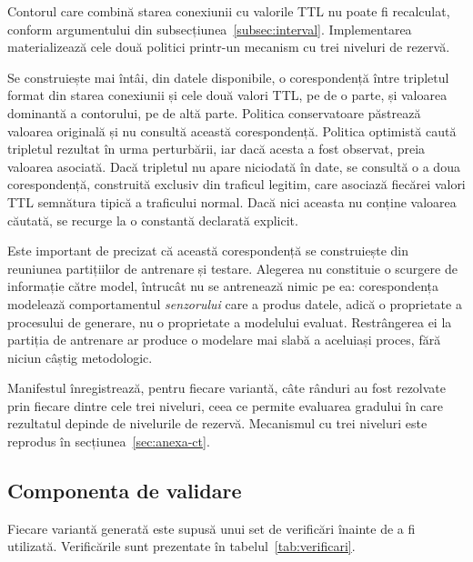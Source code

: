 Contorul care combină starea conexiunii cu valorile TTL nu poate fi recalculat, conform argumentului din subsecțiunea~\ref{subsec:interval}. Implementarea materializează cele două politici printr-un mecanism cu trei niveluri de rezervă.

Se construiește mai întâi, din datele disponibile, o corespondență între tripletul format din starea conexiunii și cele două valori TTL, pe de o parte, și valoarea dominantă a contorului, pe de altă parte. Politica conservatoare păstrează valoarea originală și nu consultă această corespondență. Politica optimistă caută tripletul rezultat în urma perturbării, iar dacă acesta a fost observat, preia valoarea asociată. Dacă tripletul nu apare niciodată în date, se consultă o a doua corespondență, construită exclusiv din traficul legitim, care asociază fiecărei valori TTL semnătura tipică a traficului normal. Dacă nici aceasta nu conține valoarea căutată, se recurge la o constantă declarată explicit.

Este important de precizat că această corespondență se construiește din reuniunea partițiilor de antrenare și testare. Alegerea nu constituie o scurgere de informație către model, întrucât nu se antrenează nimic pe ea: corespondența modelează comportamentul \emph{senzorului} care a produs datele, adică o proprietate a procesului de generare, nu o proprietate a modelului evaluat. Restrângerea ei la partiția de antrenare ar produce o modelare mai slabă a aceluiași proces, fără niciun câștig metodologic.

Manifestul înregistrează, pentru fiecare variantă, câte rânduri au fost rezolvate prin fiecare dintre cele trei niveluri, ceea ce permite evaluarea gradului în care rezultatul depinde de nivelurile de rezervă. Mecanismul cu trei niveluri este reprodus în secțiunea~\ref{sec:anexa-ct}.

\subsection{Componenta de validare}\label{subsec:validare}

Fiecare variantă generată este supusă unui set de verificări înainte de a fi utilizată. Verificările sunt prezentate în tabelul~\ref{tab:verificari}.

